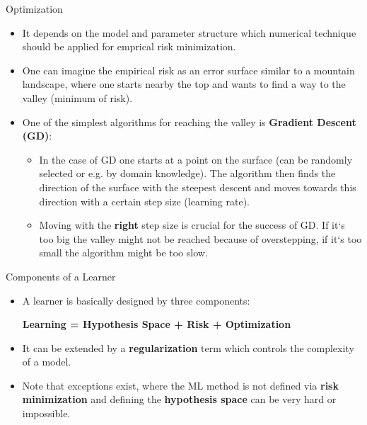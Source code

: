 \documentclass[11pt,compress,t,notes=noshow, xcolor=table]{beamer}
\begin{document}
\begin{vbframe}{Optimization}

\small
\begin{itemize}
\item It depends on the model and parameter structure which numerical technique should be applied for emprical risk minimization. 
\small
\item One can imagine the empirical risk as an error surface similar to a mountain landscape, where one starts nearby the top and wants to find a way to the valley (minimum of risk).
\small
\item One of the simplest algorithms for reaching the valley is \textbf{Gradient Descent (GD)}:
    \begin{itemize}
    \small
    \item In the case of GD one starts at a point on the surface (can be randomly selected or e.g. by domain knowledge). The algorithm then finds the direction of the surface with the steepest descent and moves towards this direction with a certain step size (learning rate). 
    \small
    \item Moving with the \textbf{right} step size is crucial for the success of GD. If it`s too big the valley might not be reached because of overstepping, if it`s too small the algorithm might be too slow.
    \end{itemize}

\end{itemize}

\end{vbframe}

\begin{vbframe}{Components of a Learner}

\begin{itemize}
\item A learner is basically designed by three components:  
\begin{center}
  \textbf{Learning = Hypothesis Space + Risk + Optimization}
\end{center}
\item It can be extended by a \textbf{regularization} term which controls the complexity of a model.
\item Note that exceptions exist, where the ML method is not defined via \textbf{risk minimization} and defining the \textbf{hypothesis space} can be very hard or impossible.
\end{itemize}


\end{vbframe}


\endlecture
\end{document}

